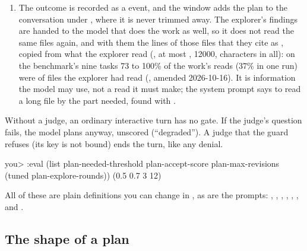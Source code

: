 \begin{enumerate}
  \item The outcome is recorded as a  event, and the window
    adds the plan to the conversation under , where it
    is never trimmed away. The explorer's findings are handed to the model that
    does the work as well, so it does not read the same files again, and with
    them the lines of those files that they cite as , copied
    from what the explorer read (, at most
    , 12000, characters in all): on the benchmark's
    nine tasks 73 to 100\% of the work's reads (37\% in one run) were of files the explorer had
    read (, amended 2026-10-16). It is information the model may use,
    not a read it must make; the system prompt says to read a long file by
    the part needed, found with .
\end{enumerate}

Without a judge, an ordinary interactive turn has no gate. If the judge's
question fails, the model plans anyway, unscored (``degraded''). A judge
that the guard refuses (its key is not bound) ends the turn, like any
denial.

\begin{txt}
you> :eval (list plan-needed-threshold plan-accept-score plan-max-revisions
                 (tuned plan-explore-rounds))
(0.5 0.7 3 12)
\end{txt}

All of these are plain definitions you can change in , as
are the prompts: , ,
, , ,
,  and
.

\subsection{The shape of a plan}

